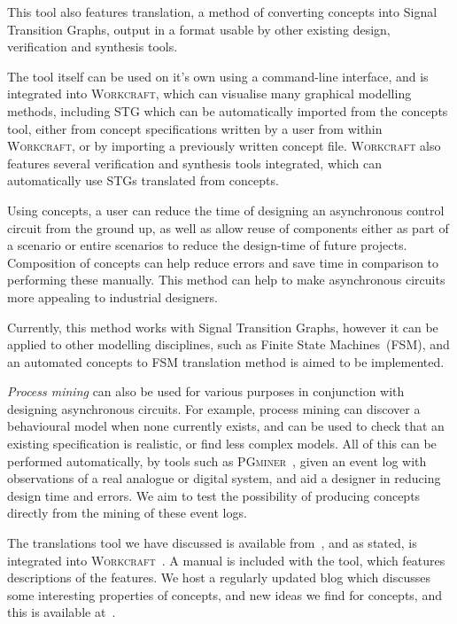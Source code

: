 \documentclass[british,conference,compsoc]{IEEEtran}
\newcommand{\noun}[1]{\textsc{#1}}
\begin{document}
This tool also features translation, a method of converting concepts into Signal
Transition Graphs, output in a format usable by other existing design, 
verification and synthesis tools. 

The tool itself can be used on it's own using a command-line interface, and is
integrated into \noun{Workcraft}, which can visualise many graphical modelling
methods, including STG which can be automatically imported from the concepts 
tool, either from concept specifications written by a user from within 
\noun{Workcraft}, or by importing a previously written concept file.
\noun{Workcraft} also features several verification and synthesis tools 
integrated, which can automatically use STGs translated from concepts. 

Using concepts, a user can reduce the time of designing an asynchronous
control circuit from the ground up, as well as allow reuse of components
either as part of a scenario or entire scenarios to reduce the design-time
of future projects. Composition of concepts can help
reduce errors and save time in comparison to performing these manually.
This method can help to make asynchronous circuits more appealing
to industrial designers.

Currently, this method works with Signal Transition Graphs, however
it can be applied to other modelling disciplines, such as Finite State
Machines~(FSM), and an automated concepts to FSM translation method
is aimed to be implemented.

\emph{Process mining} can also be used for various purposes in conjunction
with designing asynchronous circuits. For example, process mining can discover
a behavioural model when none currently exists, and can be used to check 
that an existing specification is realistic, or find less complex models. 
All of this can be performed automatically, by tools such as
\noun{PGminer}~\cite{mokhov2016mining}, given
an event log with observations of a real analogue or digital system, and aid a
designer in reducing design time and errors. We aim to test the possibility of 
producing concepts directly from the mining of these event logs.

The translations tool we have discussed is available 
from~\cite{2016_concepts_github}, and as stated, is integrated into 
\noun{Workcraft}~\cite{Workcraft_website}. A manual is included with the tool, 
which features descriptions of the features. We host a regularly updated blog 
which discusses some interesting properties of concepts, and new ideas we find 
for concepts, and this is available  at~\cite{2016_blog_concepts}.




\end{document}
